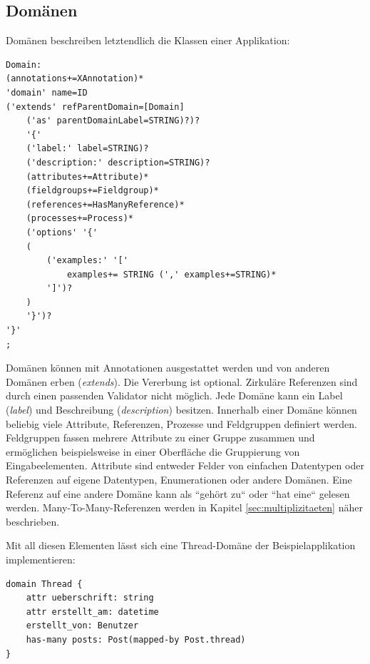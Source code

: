 \documentclass[a4paper,12pt]{scrreprt}
\begin{document}
\subsection{Domänen}
Domänen beschreiben letztendlich die Klassen einer Applikation:
\begin{verbatim}
Domain:
(annotations+=XAnnotation)*
'domain' name=ID 
('extends' refParentDomain=[Domain] 
    ('as' parentDomainLabel=STRING)?)? 
    '{'
    ('label:' label=STRING)?
    ('description:' description=STRING)? 
    (attributes+=Attribute)*
    (fieldgroups+=Fieldgroup)*
    (references+=HasManyReference)*
    (processes+=Process)*
    ('options' '{'
    (
        ('examples:' '[' 
            examples+= STRING (',' examples+=STRING)* 
        ']')?
    )
    '}')?
'}'
;
\end{verbatim}
Domänen können mit Annotationen ausgestattet werden und von anderen Domänen erben (\textit{extends}). Die Vererbung ist optional. Zirkuläre Referenzen sind durch einen passenden Validator nicht möglich.
Jede Domäne kann ein Label (\textit{label}) und Beschreibung (\textit{description}) besitzen. Innerhalb einer Domäne können beliebig viele Attribute, Referenzen, Prozesse und Feldgruppen definiert werden. Feldgruppen fassen mehrere Attribute zu einer Gruppe zusammen und ermöglichen beispielsweise in einer Oberfläche die Gruppierung von Eingabeelementen. Attribute sind entweder Felder von einfachen Datentypen oder Referenzen auf eigene Datentypen, Enumerationen oder andere Domänen. Eine Referenz auf eine andere Domäne kann als ``gehört zu`` oder ``hat eine`` gelesen werden. Many-To-Many-Referenzen werden in Kapitel \ref{sec:multiplizitaeten} näher beschrieben. 

Mit all diesen Elementen lässt sich eine Thread-Domäne der Beispielapplikation implementieren:
\begin{verbatim}
domain Thread {
    attr ueberschrift: string
    attr erstellt_am: datetime
    erstellt_von: Benutzer
    has-many posts: Post(mapped-by Post.thread)
}
\end{verbatim}
\end{document}
